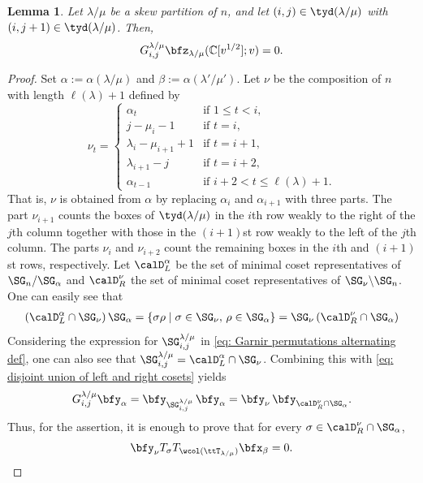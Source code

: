 \documentclass[12pt, reqno]{amsart}
\theoremstyle{plain}
\newtheorem{lemma}[lemma]{Lemma}
\theoremstyle{definition}
\numberwithin{equation}{section}
\numberwithin{figure}{section}
\numberwithin{table}{section}
\def\C{\mathbb C}
\begin{document}
\begin{lemma}\label{lem: Garnir rel}
Let $\lambda/\mu$ be a skew partition of  $n$, and let $(i, j) \in \tyd(\lambda/\mu)$ with $(i, j+1) \in \tyd(\lambda/\mu)$.
Then,
\begin{equation*}
G^{\lambda/\mu}_{i, j} \bfz_{\lambda/\mu}(\C[v^{1/2}];v) = 0.
\end{equation*}
\end{lemma}
\begin{proof}
Set $\alpha := \alpha(\lambda/\mu)$ and $\beta := \alpha(\lambda'/\mu')$.
Let $\nu$ be the composition of $n$ with length $\ell(\lambda) + 1$ defined by 
\[
\nu_t = \begin{cases}
  \alpha_t  & \text{if $1 \leq t < i$,}\\
  j - \mu_i - 1 & \text{if  $t = i$,}\\
  \lambda_i - \mu_{i+1} + 1 & \text{if  $t = i+1$,}\\
  \lambda_{i+1} - j & \text{if  $t = i+2$,}\\
  \alpha_{t - 1} & \text{if $i+2 < t \leq \ell(\lambda) + 1$.}
\end{cases}
\]
That is, $\nu$ is obtained from $\alpha$ by replacing $\alpha_i$ and $\alpha_{i+1}$ with three parts.
The part $\nu_{i+1}$ counts the boxes of $\tyd(\lambda/\mu)$ in the $i$th row weakly to the right of the $j$th column together with those in the $(i+1)$st row weakly to the left of the $j$th column.
The parts $\nu_i$ and $\nu_{i+2}$ count the remaining boxes in the $i$th and $(i+1)$st rows, respectively.
Let $\calD_L^\alpha$ be the set of minimal coset representatives of $\SG_n/\SG_\alpha$ and $\calD_R^\nu$ the set of minimal coset representatives of $\SG_\nu\backslash\SG_n$. 
One can easily see that
\begin{align}\label{eq: disjoint union of left and right cosets}
\left( \calD_L^\alpha \cap \SG_\nu \right) \SG_\alpha
= \{\sigma \rho \mid \sigma \in \SG_\nu,\, \rho \in \SG_\alpha \}
= \SG_\nu \left( \calD_R^\nu \cap \SG_\alpha \right)
\end{align}
Considering the expression for $\SG^{\lambda/\mu}_{i,j}$ in \cref{eq: Garnir permutations alternating def}, one can also see that $\SG^{\lambda/\mu}_{i,j} = \calD_L^\alpha \cap \SG_\nu$. 
Combining this with \cref{eq: disjoint union of left and right cosets} yields
\[
G^{\lambda/\mu}_{i, j} \bfy_\alpha 
= \bfy_{\SG^{\lambda/\mu}_{i,j}} \, \bfy_\alpha 
= \bfy_\nu \, \bfy_{\calD_R^\nu \cap \SG_\alpha}.
\]
Thus, for the assertion, it is enough to prove that  for every $\sigma \in \calD_R^\nu \cap \SG_\alpha$,
\begin{align}\label{eq: want to show for A3}
\bfy_\nu T_\sigma T_{\wcol(\ttT_{\lambda/\mu})} \bfx_\beta = 0.
\end{align}


\end{proof}
\end{document}
